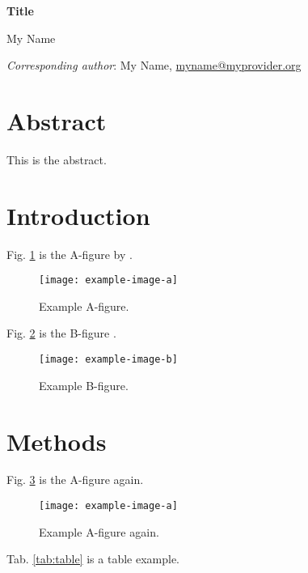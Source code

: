 \documentclass[11pt]{article} %
\begin{document}
\thispagestyle{empty} %
\begin{center}

\vspace*{2cm}
\LARGE{\textbf{Title}}\\
\vspace{2cm}

\normalsize
My Name

\end{center}
\vfill
\textit{Corresponding author}: My Name, \href{mailto:me.de}{myname@myprovider.org}

\newpage
{} %

\section*{Abstract}

This is the abstract.

\section{Introduction}

Fig. \ref{fig:a} is the A-figure by \citet{einstein}.

\begin{figure}[H]
\centering\noindent\texttt{[image: example-image-a]}
\caption{Example A-figure.}
\label{fig:a}
\end{figure}

Fig. \ref{fig:b} is the B-figure \citep{einstein}.

\begin{figure}[H]
\centering\noindent\texttt{[image: example-image-b]}
\caption{Example B-figure.}
\label{fig:b}
\end{figure}

\section{Methods}

Fig. \ref{fig:a2} is the A-figure again.

\begin{figure}[H]
\centering\noindent\texttt{[image: example-image-a]}
\caption{Example A-figure again.}
\label{fig:a2}
\end{figure}

Tab. \ref{tab:table} is a table example.
\end{document}
